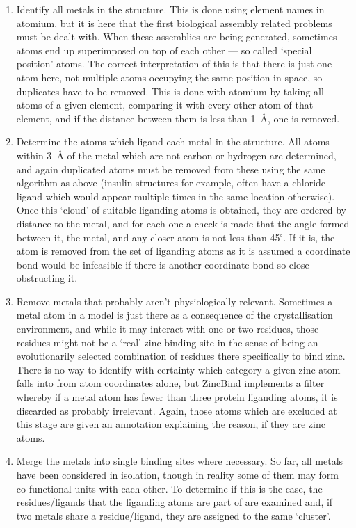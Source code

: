 \begin{enumerate}
   \item Identify all metals in the structure. This is done using element names in atomium, but it is here that the first biological assembly related problems must be dealt with. When these assemblies are being generated, sometimes atoms end up superimposed on top of each other --- so called `special position' atoms. The correct interpretation of this is that there is just one atom here, not multiple atoms occupying the same position in space, so duplicates have to be removed. This is done with atomium by taking all atoms of a given element, comparing it with every other atom of that element, and if the distance between them is less than 1~{\AA}, one is removed.
   \item Determine the atoms which ligand each metal in the structure. All atoms within 3~{\AA} of the metal which are not carbon or hydrogen are determined, and again duplicated atoms must be removed from these using the same algorithm as above (insulin structures for example, often have a chloride ligand which would appear multiple times in the same location otherwise). Once this `cloud' of suitable liganding atoms is obtained, they are ordered by distance to the metal, and for each one a check is made that the angle formed between it, the metal, and any closer atom is not less than 45$^\circ$. If it is, the atom is removed from the set of liganding atoms as it is assumed a coordinate bond would be infeasible if there is another coordinate bond so close obstructing it.
   \item Remove metals that probably aren't physiologically relevant. Sometimes a metal atom in a model is just there as a consequence of the crystallisation environment, and while it may interact with one or two residues, those residues might not be a `real' zinc binding site in the sense of being an evolutionarily selected combination of residues there specifically to bind zinc. There is no way to identify with certainty which category a given zinc atom falls into from atom coordinates alone, but ZincBind implements a filter whereby if a metal atom has fewer than three protein liganding atoms, it is discarded as probably irrelevant. Again, those atoms which are excluded at this stage are given an annotation explaining the reason, if they are zinc atoms.
   \item Merge the metals into single binding sites where necessary. So far, all metals have been considered in isolation, though in reality some of them may form co-functional units with each other. To determine if this is the case, the residues/ligands that the liganding atoms are part of are examined and, if two metals share a residue/ligand, they are assigned to the same `cluster'.

\end{enumerate}
